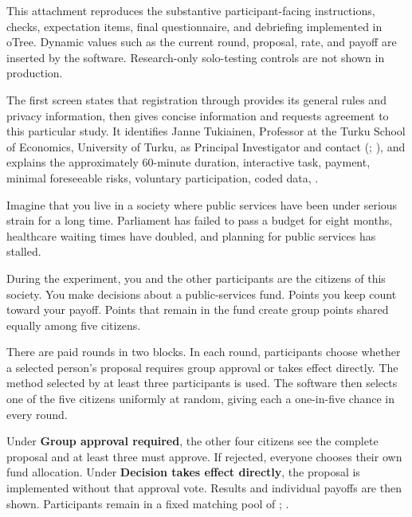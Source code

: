 


This attachment reproduces the substantive participant-facing instructions, checks, expectation items, final questionnaire, and debriefing implemented in oTree. Dynamic values such as the current round, proposal, rate, and payoff are inserted by the software. Research-only solo-testing controls are not shown in production.

The first screen states that registration through  provides its general rules and privacy information, then gives concise information and requests agreement to this particular study. It identifies Janne Tukiainen, Professor at the Turku School of Economics, University of Turku, as Principal Investigator and contact (\StudyEmail; \StudyPhone), and explains the approximately 60-minute duration, interactive task, payment, minimal foreseeable risks, voluntary participation, coded data, .

Imagine that you live in a society where public services have been under serious strain for a long time. Parliament has failed to pass a budget for eight months, healthcare waiting times have doubled, and planning for public services has stalled.

During the experiment, you and the other participants are the citizens of this society. You make decisions about a public-services fund. Points you keep count toward your payoff. Points that remain in the fund create group points shared equally among five citizens.

There are  paid rounds in two blocks. In each round, participants choose whether a selected person's proposal requires group approval or takes effect directly. The method selected by at least three participants is used. The software then selects one of the five citizens uniformly at random, giving each a one-in-five chance in every round.

Under \textbf{Group approval required}, the other four citizens see the complete proposal and at least three must approve. If rejected, everyone chooses their own fund allocation. Under \textbf{Decision takes effect directly}, the proposal is implemented without that approval vote. Results and individual payoffs are then shown. Participants remain in a fixed matching pool of ; .

